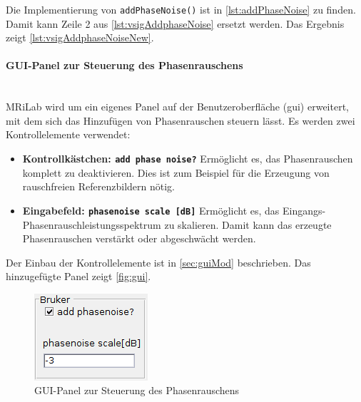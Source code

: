 Die Implementierung von \texttt{addPhaseNoise()} ist in \autoref{lst:addPhaseNoise} zu finden. Damit kann Zeile 2 aus \autoref{lst:vsigAddphaseNoise} ersetzt werden. Das Ergebnis zeigt \autoref{lst:vsigAddphaseNoiseNew}.


\clearpage
\paragraph{GUI-Panel zur Steuerung des Phasenrauschens}\mbox{}\\
MRiLab wird um ein eigenes Panel auf der Benutzeroberfläche (\gls{gui}) erweitert, mit dem sich das Hinzufügen von Phasenrauschen steuern lässt. Es werden zwei Kontrollelemente verwendet:
\begin{itemize}
	\item \textbf{Kontrollkästchen: \texttt{add phase noise?}} Ermöglicht es, das Phasenrauschen komplett zu deaktivieren. Dies ist zum Beispiel für die Erzeugung von rauschfreien Referenzbildern nötig.
	\item \textbf{Eingabefeld: \texttt{phasenoise scale [dB]}} Ermöglicht es, das Eingangs-Phasen\-rausch\-leistungs\-spektrum zu skalieren. Damit kann das erzeugte Phasenrauschen verstärkt oder abgeschwächt werden.  
\end{itemize}

Der Einbau der Kontrollelemente ist in \autoref{sec:guiMod} beschrieben. Das hinzugefügte Panel zeigt \autoref{fig:gui}.

\begin{figure}[H]
	\centering
	\includegraphics[]{img/brukerPanel.png}
	\caption[Neues GUI-Panel]{GUI-Panel zur Steuerung des Phasenrauschens}
	\label{fig:gui}
\end{figure}




